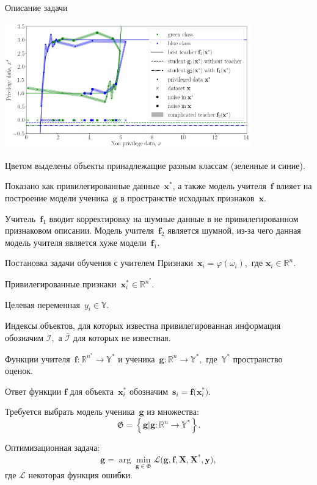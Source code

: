\documentclass[10pt,pdf,hyperref={unicode}]{beamer}
\begin{document}

\begin{frame}{Описание задачи}
\justifying
\begin{center}
	\includegraphics[width=0.8\textwidth]{figures/explanation}
\end{center}
Цветом выделены объекты принадлежащие разным классам (зеленные и синие).

Показано как привилегированные данные~$\mathbf{x}^*$, а также модель учителя~$\mathbf{f}$ влияет на построение модели ученика~$\mathbf{g}$ в пространстве исходных признаков~$\mathbf{x}$.

Учитель~$\mathbf{f}_1$ вводит корректировку на шумные данные в не привилегированном признаковом описании.
Модель учителя~$\mathbf{f}_2$ является шумной, из-за чего данная модель учителя является хуже модели~$\mathbf{f}_1$.
\end{frame}
\begin{frame}{Постановка задачи обучения с учителем}
\justifying
Признаки~$\mathbf{x}_i = \varphi(\omega_i),$ где $\mathbf{x}_i \in \mathbb{R}^{n}$.

Привилегированные признаки~$\mathbf{x}^*_i \in \mathbb{R}^{n^*}.$

Целевая переменная~$y_i \in \mathbb{Y}$.

Индексы объектов, для которых известна привилегированная информация обозначим $\mathcal{I},$ а $\bar{\mathcal{I}}$ для которых не известная.

\bigskip

Функции учителя~$\mathbf{f}:\mathbb{R}^{n^*} \to \mathbb{Y}^*$ и ученика~$\mathbf{g}:\mathbb{R}^{n} \to \mathbb{Y}^*,$ где~$\mathbb{Y}^*$ пространство оценок.

Ответ функции $\mathbf{f}$ для объекта~$\mathbf{x}^*_i$ обозначим~$\mathbf{s}_i = \mathbf{f}\bigr(\mathbf{x}_i^*\bigr)$.

\bigskip

Требуется выбрать модель ученика~$\mathbf{g}$ из множества:
\[
	\mathfrak{G} = \left\{\mathbf{g}| \mathbf{g}:\mathbb{R}^{n} \to \mathbb{Y}^*\right\}.
\]

Оптимизационная задача:
\[
	\mathbf{g} = \arg\min_{\mathbf{g} \in \mathfrak{G}} \mathcal{L}\bigr(\mathbf{g}, \mathbf{f}, \mathbf{X}, \mathbf{X}^{*}, \mathbf{y}\bigr),
\]
где $\mathcal{L}$ некоторая функция ошибки.
\end{frame}
\end{document}
